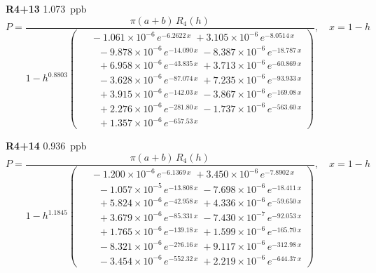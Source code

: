 \documentclass[12pt]{article}
\begin{document}
\noindent\textbf{R4+13} 1.073~ppb\nopagebreak
\begin{equation*}
P = \frac{\pi(a{+}b)\,R_4(h)}{1 - h^{0.8803}\!\left(\!\begin{aligned}
  &\; -1.061{\times}10^{-6}\,e^{-6.2622\,x} \; +3.105{\times}10^{-6}\,e^{-8.0514\,x} \\[-3pt]
  &\quad -9.878{\times}10^{-6}\,e^{-14.090\,x} \; -8.387{\times}10^{-6}\,e^{-18.787\,x} \\[-3pt]
  &\quad +6.958{\times}10^{-6}\,e^{-43.835\,x} \; +3.713{\times}10^{-6}\,e^{-60.869\,x} \\[-3pt]
  &\quad -3.628{\times}10^{-6}\,e^{-87.074\,x} \; +7.235{\times}10^{-6}\,e^{-93.933\,x} \\[-3pt]
  &\quad +3.915{\times}10^{-6}\,e^{-142.03\,x} \; -3.867{\times}10^{-6}\,e^{-169.08\,x} \\[-3pt]
  &\quad +2.276{\times}10^{-6}\,e^{-281.80\,x} \; -1.737{\times}10^{-6}\,e^{-563.60\,x} \\[-3pt]
  &\quad +1.357{\times}10^{-6}\,e^{-657.53\,x}
\end{aligned}\!\right)}, \quad x = 1{-}h
\end{equation*}

\noindent\textbf{R4+14} 0.936~ppb\nopagebreak
\begin{equation*}
P = \frac{\pi(a{+}b)\,R_4(h)}{1 - h^{1.1845}\!\left(\!\begin{aligned}
  &\; -1.200{\times}10^{-6}\,e^{-6.1369\,x} \; +3.450{\times}10^{-6}\,e^{-7.8902\,x} \\[-3pt]
  &\quad -1.057{\times}10^{-5}\,e^{-13.808\,x} \; -7.698{\times}10^{-6}\,e^{-18.411\,x} \\[-3pt]
  &\quad +5.824{\times}10^{-6}\,e^{-42.958\,x} \; +4.336{\times}10^{-6}\,e^{-59.650\,x} \\[-3pt]
  &\quad +3.679{\times}10^{-6}\,e^{-85.331\,x} \; -7.430{\times}10^{-7}\,e^{-92.053\,x} \\[-3pt]
  &\quad +1.765{\times}10^{-6}\,e^{-139.18\,x} \; +1.599{\times}10^{-6}\,e^{-165.70\,x} \\[-3pt]
  &\quad -8.321{\times}10^{-6}\,e^{-276.16\,x} \; +9.117{\times}10^{-6}\,e^{-312.98\,x} \\[-3pt]
  &\quad -3.454{\times}10^{-6}\,e^{-552.32\,x} \; +2.219{\times}10^{-6}\,e^{-644.37\,x}
\end{aligned}\!\right)}, \quad x = 1{-}h
\end{equation*}
\end{document}
